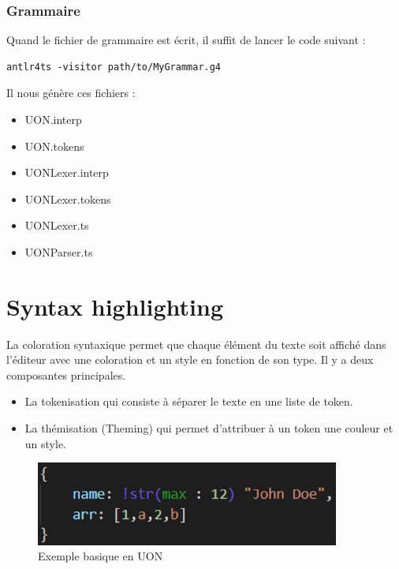 \documentclass[
    iict, %
    il, %
]{heig-tb}
\begin{document}
\subsubsection{Grammaire}

Quand le fichier de grammaire est écrit, il suffit de lancer le code suivant :

\begin{lstlisting}[frame=single]
    antlr4ts -visitor path/to/MyGrammar.g4
\end{lstlisting}

Il nous génère ces fichiers :
\begin{itemize}
    \item UON.interp
    \item UON.tokens
    \item UONLexer.interp
    \item UONLexer.tokens
    \item UONLexer.ts
    \item UONParser.ts
\end{itemize}

\section{Syntax highlighting}

La coloration syntaxique permet que chaque élément du texte soit affiché dans l'éditeur avec une coloration et un style en fonction de son type.
Il y a deux composantes principales.
\begin{itemize}
    \item La tokenisation qui consiste à séparer le texte en une liste de token.
    \item La thémisation (Theming) qui permet d'attribuer à un token une couleur et un style.
\end{itemize}

\begin{figure}[!h]
    \begin{center}
        \includegraphics[width=10cm]{assets/figures/basic-uon.png}
    \end{center}
    \caption[code UON]{\label{basic-uon} Exemple basique en UON}
\end{figure}
\end{document}
